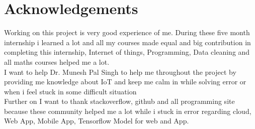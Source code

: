 \chapter*{Acknowledgements}
Working on this project is very good experience of me. During these five month internship i learned a lot and all my courses made equal and big contribution in completing this internship, Internet of things, Programming, Data cleaning and all maths courses helped me a lot.\\

I want to help Dr. Munesh Pal Singh to help me throughout the project by providing me knowledge about IoT and keep me calm in while solving error or when i feel stuck in some difficult situation\\

Further on I want to thank stackoverflow, github and all programming site because these community helped me a lot while i stuck in error regarding cloud, Web App, Mobile App, Tensorflow Model for web and App. 



\vspace{3cm}

